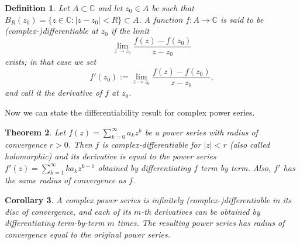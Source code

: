 \documentclass[a4paper,reqno]{amsart}
\numberwithin{equation}{section}
\newtheorem{definition}{Definition}[section]
\newtheorem{theorem}[definition]{Theorem}
\newtheorem{corollary}[definition]{Corollary}
\def\C{\mathbb{C}}
\begin{document}
\begin{definition}
Let $A\subset \C$ and let $z_0\in A$ be such that $B_R(z_0)=\{z\in \C: |z-z_0|<R\}\subset A$. A function $f:A\to \C$ is said to be (complex-)differentiable at $z_0$ if the limit 
$$
\lim_{z\to z_0}\frac{f(z)-f(z_0)}{z-z_0}
$$
exists; in that case we set 
$$
f'(z_0):= \lim_{z\to z_0}\frac{f(z)-f(z_0)}{z-z_0},
$$
and call it the derivative of $f$ at $z_0$. 
\end{definition}

Now we can state the differentiability result for complex power series.

\begin{theorem}
Let $f(z)=\sum_{k=0}^\infty a_k z^k$ be a power series with radius of convergence $r>0$. Then $f$ is complex-differentiable for $|z|<r$ (also called holomorphic) and its derivative is equal to the power series 
$f'(z) = \sum_{k=1}^\infty ka_k z^{k-1}$ obtained by differentiating $f$ term by term. Also, $f'$ has the same radius of convergence as $f$.
\end{theorem}

\begin{corollary}
A complex power series is infinitely (complex-)differentiable in its disc of convergence, and each of its $m$-th derivatives can be obtained by differentiating term-by-term $m$ times. The resulting power series has radius of convergence equal to the original power series.
\end{corollary}
\end{document}
